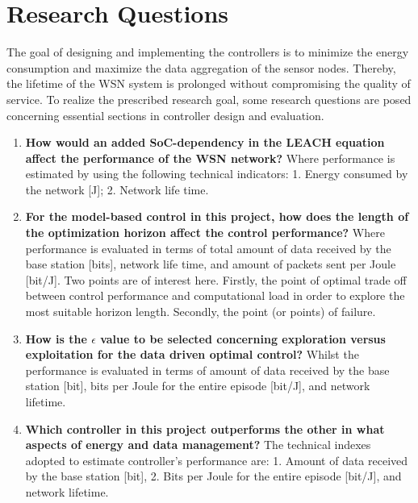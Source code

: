 \section{Research Questions}
\label{MainRQ}
\noindent The goal of designing and implementing the controllers is to minimize the energy consumption and maximize the data aggregation of the sensor nodes. Thereby, the lifetime of the WSN system is prolonged without compromising the quality of service. To realize the prescribed research goal, some research questions are posed concerning essential sections in controller design and evaluation. \newline

\begin{enumerate}[label=Q\arabic*]
    \item \textbf{How would an added SoC-dependency in the LEACH equation affect the performance of the WSN network?}\newline
    Where performance is estimated by using the following technical indicators: 1. Energy consumed by the network [J]; 2. Network life time.
    \item \textbf{For the model-based control in this project, how does the length of the optimization horizon affect the control performance?}\newline
    Where performance is evaluated in terms of total amount of data received by the base station [bits], network life time, and amount of packets sent per Joule [bit/J].
    Two points are of interest here. Firstly, the point of optimal trade off between control performance and computational load in order to explore the most suitable horizon length. Secondly, the point (or points) of failure.
    \item \textbf{How is the $\epsilon$ value to be selected concerning exploration versus exploitation for the data driven optimal control?}\newline
    Whilst the performance is evaluated in terms of amount of data received by the base station [bit], bits per Joule for the entire episode [bit/J], and network lifetime.
    \item \textbf{Which controller in this project outperforms the other in what aspects of energy and data management?}\newline
    The technical indexes adopted to estimate controller's performance are: 1. Amount of data received by the base station [bit], 2. Bits per Joule for the entire episode [bit/J], and network lifetime.
\end{enumerate}


